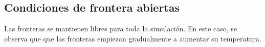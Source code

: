 \documentclass{article}
\begin{document}
\subsection*{Condiciones de frontera abiertas}
Las fronteras se mantienen libres para toda la simulación. En este caso, se observa que que las fronteras empiezan gradualmente a aumentar su temperatura.
\begin{figure}[H]
    \centering

\end{figure}
\end{document}
